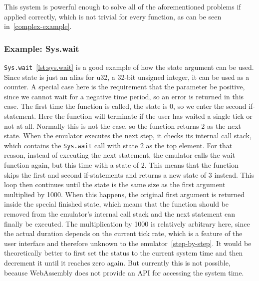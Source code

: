 This system is powerful enough to solve all of the aforementioned problems if applied correctly, which is not trivial for every function, as can be seen in~\cref{complex-example}.
\subsubsection{Example: Sys.wait} \label{sys.wait-example}
\verb+Sys.wait+~\ref{lst:sys.wait} is a good example of how the state argument can be used.
Since state is just an alias for u32, a 32-bit unsigned integer, it can be used as a counter.
A special case here is the requirement that the parameter be positive, since we cannot wait for a negative time period, so an error is returned in this case.
The first time the function is called, the state is \(0\), so we enter the second if-statement.
Here the function will terminate if the user has waited a single tick or not at all.
Normally this is not the case, so the function returns \(2\) as the next state.
When the emulator executes the next step, it checks its internal call stack, which contains the \verb+Sys.wait+ call with state \(2\) as the top element.
For that reason, instead of executing the next statement, the emulator calls the wait function again, but this time with a state of \(2\).
This means that the function skips the first and second if-statements and returns a new state of \(3\) instead.
This loop then continues until the state is the same size as the first argument multiplied by 1000.
When this happens, the original first argument is returned inside the special finished state, which means that the function should be removed from the emulator's internal call stack and the next statement can finally be executed.
The multiplication by 1000 is relatively arbitrary here, since the actual duration depends on the current tick rate, which is a feature of the user interface and therefore unknown to the emulator~\ref{step-by-step}.
It would be theoretically better to first set the status to the current system time and then decrement it until it reaches zero again.
But currently this is not possible, because WebAssembly does not provide an API for accessing the system time.

